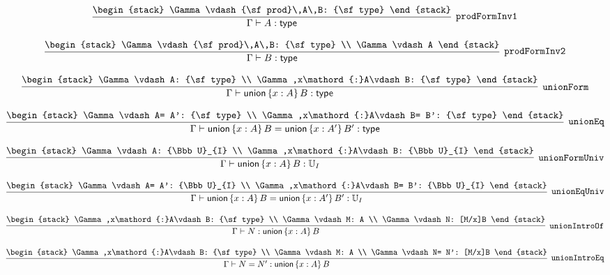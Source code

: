 \[
\infer[{\tt prodFormInv1}]{\Gamma \vdash A: {\sf type}}{
\begin{stack}
\Gamma \vdash {\sf prod}\,A\,B: {\sf type}
\end{stack}}
\]

\[
\infer[{\tt prodFormInv2}]{\Gamma \vdash B: {\sf type}}{
\begin{stack}
\Gamma \vdash {\sf prod}\,A\,B: {\sf type}
\\
\Gamma \vdash A
\end{stack}}
\]

\[
\infer[{\tt unionForm}]{\Gamma \vdash {\sf union}\,\{x : A\}\,B: {\sf type}}{
\begin{stack}
\Gamma \vdash A: {\sf type}
\\
\Gamma ,x\mathord{:}A\vdash B: {\sf type}
\end{stack}}
\]

\[
\infer[{\tt unionEq}]{\Gamma \vdash {\sf union}\,\{x : A\}\,B= {\sf union}\,\{x : A'\}\,B': {\sf type}}{
\begin{stack}
\Gamma \vdash A= A': {\sf type}
\\
\Gamma ,x\mathord{:}A\vdash B= B': {\sf type}
\end{stack}}
\]

\[
\infer[{\tt unionFormUniv}]{\Gamma \vdash {\sf union}\,\{x : A\}\,B: {\Bbb U}_{I}}{
\begin{stack}
\Gamma \vdash A: {\Bbb U}_{I}
\\
\Gamma ,x\mathord{:}A\vdash B: {\Bbb U}_{I}
\end{stack}}
\]

\[
\infer[{\tt unionEqUniv}]{\Gamma \vdash {\sf union}\,\{x : A\}\,B= {\sf union}\,\{x : A'\}\,B': {\Bbb U}_{I}}{
\begin{stack}
\Gamma \vdash A= A': {\Bbb U}_{I}
\\
\Gamma ,x\mathord{:}A\vdash B= B': {\Bbb U}_{I}
\end{stack}}
\]

\[
\infer[{\tt unionIntroOf}]{\Gamma \vdash N: {\sf union}\,\{x : A\}\,B}{
\begin{stack}
\Gamma ,x\mathord{:}A\vdash B: {\sf type}
\\
\Gamma \vdash M: A
\\
\Gamma \vdash N: [M/x]B
\end{stack}}
\]

\[
\infer[{\tt unionIntroEq}]{\Gamma \vdash N= N': {\sf union}\,\{x : A\}\,B}{
\begin{stack}
\Gamma ,x\mathord{:}A\vdash B: {\sf type}
\\
\Gamma \vdash M: A
\\
\Gamma \vdash N= N': [M/x]B
\end{stack}}
\]

